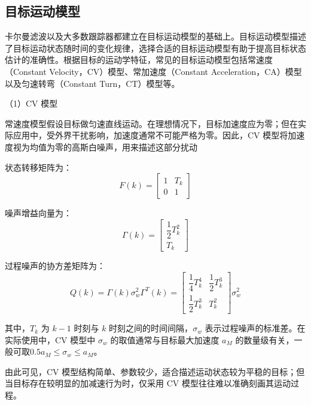 \documentclass{xdupgthesis}
\begin{document}
\subsection{目标运动模型}

卡尔曼滤波以及大多数跟踪器都建立在目标运动模型的基础上。目标运动模型描述了目标运动状态随时间的变化规律，选择合适的目标运动模型有助于提高目标状态估计的准确性。根据目标的运动学特征，常见的目标运动模型包括常速度（Constant Velocity，CV）模型、常加速度（Constant Acceleration，CA）模型以及匀速转弯（Constant Turn，CT）模型等。


\textnormal{（1）CV 模型}\par\vspace{0.3\baselineskip}

常速度模型假设目标做匀速直线运动。在理想情况下，目标加速度应为零；但在实际应用中，受外界干扰影响，加速度通常不可能严格为零。因此，CV 模型将加速度视为均值为零的高斯白噪声，用来描述这部分扰动

状态转移矩阵为：
\begin{equation}
	F(k)=
	\begin{bmatrix}
		1 & T_k\\
		0 & 1
	\end{bmatrix}
\end{equation}

噪声增益向量为：
\begin{equation}
	\Gamma(k)=
	\begin{bmatrix}
		\dfrac{1}{2}T_k^2\\
		T_k
	\end{bmatrix}
\end{equation}

过程噪声的协方差矩阵为：
\begin{equation}
	Q(k)=\Gamma(k)\sigma_w^2\Gamma^{T}(k)=
	\begin{bmatrix}
		\dfrac{1}{4}T_k^4 & \dfrac{1}{2}T_k^3\\[6pt]
		\dfrac{1}{2}T_k^3 & T_k^2
	\end{bmatrix}\sigma_w^2
\end{equation}

其中，$T_k$ 为 $k-1$ 时刻与 $k$ 时刻之间的时间间隔，$\sigma_w$ 表示过程噪声的标准差。在实际使用中，CV 模型中 $\sigma_w$ 的取值通常与目标最大加速度 $a_M$ 的数量级有关，一般可取\(0.5a_M \leq \sigma_w \leq a_M\)\cite{barshalom2004estimation}。


由此可见，CV 模型结构简单、参数较少，适合描述运动状态较为平稳的目标；但当目标存在较明显的加减速行为时，仅采用 CV 模型往往难以准确刻画其运动过程。
\end{document}
